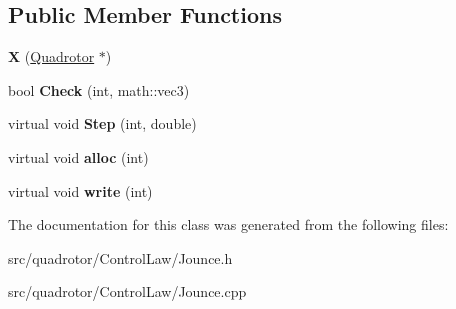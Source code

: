\subsection*{\-Public \-Member \-Functions}
\begin{DoxyCompactItemize}
\item 
\hypertarget{classJounce_1_1X_a8a32e0c522fceca1c238f090f199703f}{{\bfseries \-X} (\hyperlink{classQuadrotor}{\-Quadrotor} $\ast$)}\label{classJounce_1_1X_a8a32e0c522fceca1c238f090f199703f}

\item 
\hypertarget{classJounce_1_1X_a5517653cfa6e81ceca032d1692e36842}{bool {\bfseries \-Check} (int, math\-::vec3)}\label{classJounce_1_1X_a5517653cfa6e81ceca032d1692e36842}

\item 
\hypertarget{classJounce_1_1X_aa37ceb36cb1a026f825e02c329f3c56e}{virtual void {\bfseries \-Step} (int, double)}\label{classJounce_1_1X_aa37ceb36cb1a026f825e02c329f3c56e}

\item 
\hypertarget{classJounce_1_1X_a531bc708807c552fbc3d28a6ac0c11a5}{virtual void {\bfseries alloc} (int)}\label{classJounce_1_1X_a531bc708807c552fbc3d28a6ac0c11a5}

\item 
\hypertarget{classJounce_1_1X_ad860d72f6b64207c6e8ba9927e1ea55c}{virtual void {\bfseries write} (int)}\label{classJounce_1_1X_ad860d72f6b64207c6e8ba9927e1ea55c}

\end{DoxyCompactItemize}


\-The documentation for this class was generated from the following files\-:\begin{DoxyCompactItemize}
\item 
src/quadrotor/\-Control\-Law/\-Jounce.\-h\item 
src/quadrotor/\-Control\-Law/\-Jounce.\-cpp\end{DoxyCompactItemize}
